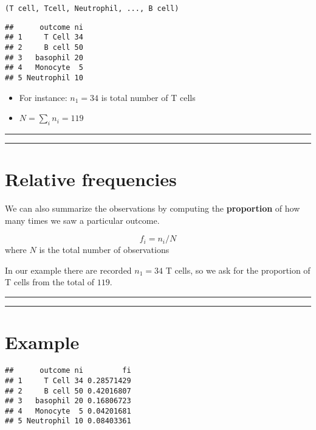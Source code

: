 \documentclass[
]{book}
\providecommand{\tightlist}{%
  \setlength{\itemsep}{0pt}\setlength{\parskip}{0pt}}
\begin{document}
\begin{verbatim}
(T cell, Tcell, Neutrophil, ..., B cell)
\end{verbatim}

\begin{verbatim}
##      outcome ni
## 1     T Cell 34
## 2     B cell 50
## 3   basophil 20
## 4   Monocyte  5
## 5 Neutrophil 10
\end{verbatim}

\begin{itemize}
\tightlist
\item
  For instance: \(n_1=34\) is total number of T cells
\item
  \(N=\sum_i n_i=119\)
\end{itemize}

\begin{center}\rule{0.5\linewidth}{0.5pt}\end{center}

\begin{center}\rule{0.5\linewidth}{0.5pt}\end{center}

\hypertarget{relative-frequencies}{%
\section{Relative frequencies}\label{relative-frequencies}}

We can also summarize the observations by computing the \textbf{proportion} of how many times we saw a particular outcome.

\[f_i=n_i/N\] where \(N\) is the total number of observations

In our example there are recorded \(n_1=34\) T cells, so we ask for the proportion of T cells from the total of \(119\).

\begin{center}\rule{0.5\linewidth}{0.5pt}\end{center}

\begin{center}\rule{0.5\linewidth}{0.5pt}\end{center}

\hypertarget{example-1}{%
\section{Example}\label{example-1}}

\begin{verbatim}
##      outcome ni         fi
## 1     T Cell 34 0.28571429
## 2     B cell 50 0.42016807
## 3   basophil 20 0.16806723
## 4   Monocyte  5 0.04201681
## 5 Neutrophil 10 0.08403361
\end{verbatim}
\end{document}
